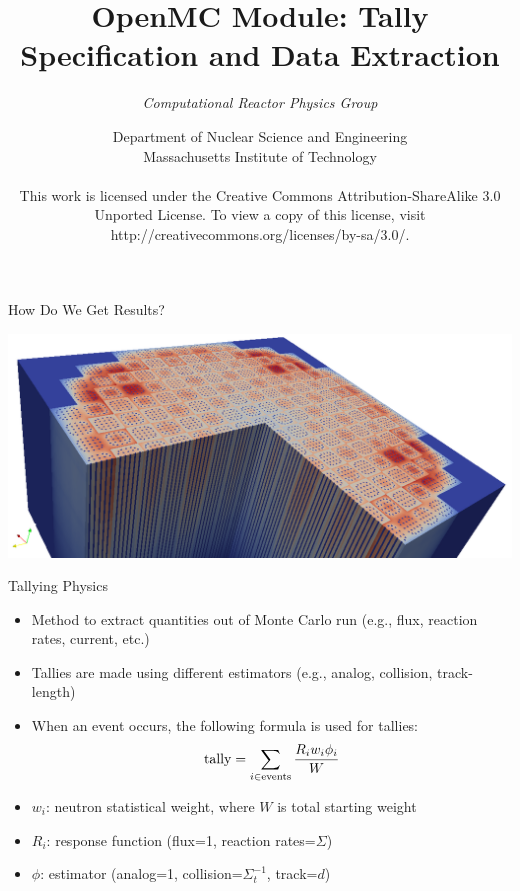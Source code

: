 \documentclass[serif]{beamer}
\title{OpenMC Module: Tally Specification and Data Extraction}
\author{\emph{Computational Reactor Physics Group}}
\date{\normalsize Department of Nuclear Science and Engineering\\
                  Massachusetts Institute of Technology \\
~\\
\tiny{This work is licensed under the Creative Commons Attribution-ShareAlike 3.0 Unported License. To view a copy of this license, visit http://creativecommons.org/licenses/by-sa/3.0/.}}
\begin{document}

\frame{\titlepage}\logo{} %



\begin{frame}{How Do We Get Results?}

  \centering
  \includegraphics[width=\linewidth]{src/3dcore.png}

\end{frame}


\begin{frame}{Tallying Physics}

  \begin{itemize}
    \item Method to extract quantities out of Monte Carlo run (e.g., flux, reaction rates, current, etc.)\vfill
    \item Tallies are made using different estimators (e.g., analog, collision, track-length)\vfill
    \item When an event occurs, the following formula is used for tallies:
\[
      {\rm{tally}} = \sum_{i\in\rm{events}}\frac{R_iw_i\phi_i}{W}
\]\vfill
    \item $w_i$: neutron statistical weight, where $W$ is total starting weight
    \item $R_i$: response function (flux=1, reaction rates=$\Sigma$)
    \item $\phi$: estimator (analog=1, collision=$\Sigma_t^{-1}$, track=$d$)
  \end{itemize}

\end{frame}

\end{document}
